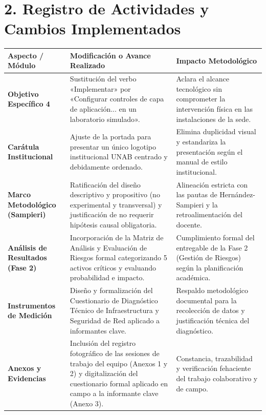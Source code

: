 \documentclass[11pt,letterpaper]{article}
\begin{document}
\section*{\color{unabblue}2. Registro de Actividades y Cambios Implementados}

\begin{table}[h!]
  \centering
  \small
  \renewcommand{\arraystretch}{1.3}
  \begin{tabularx}{\textwidth}{@{}>{\bfseries}p{3.2cm} X X@{}}
    \toprule
    \color{unabblue}\textbf{Aspecto / Módulo} & \color{unabblue}\textbf{Modificación o Avance Realizado} & \color{unabblue}\textbf{Impacto Metodológico} \\
    \midrule
    Objetivo Específico 4 & Sustitución del verbo «Implementar» por «Configurar controles de capa de aplicación... en un laboratorio simulado». & Aclara el alcance tecnológico sin comprometer la intervención física en las instalaciones de la sede. \\
    \midrule
    Carátula Institucional & Ajuste de la portada para presentar un único logotipo institucional UNAB centrado y debidamente ordenado. & Elimina duplicidad visual y estandariza la presentación según el manual de estilo institucional. \\
    \midrule
    Marco Metodológico (Sampieri) & Ratificación del diseño descriptivo y propositivo (no experimental y transversal) y justificación de no requerir hipótesis causal obligatoria. & Alineación estricta con las pautas de Hernández-Sampieri y la retroalimentación del docente. \\
    \midrule
    Análisis de Resultados (Fase 2) & Incorporación de la Matriz de Análisis y Evaluación de Riesgos formal categorizando 5 activos críticos y evaluando probabilidad e impacto. & Cumplimiento formal del entregable de la Fase 2 (Gestión de Riesgos) según la planificación académica. \\
    \midrule
    Instrumentos de Medición & Diseño y formalización del Cuestionario de Diagnóstico Técnico de Infraestructura y Seguridad de Red aplicado a informantes clave. & Respaldo metodológico documental para la recolección de datos y justificación técnica del diagnóstico. \\
    \midrule
    Anexos y Evidencias & Inclusión del registro fotográfico de las sesiones de trabajo del equipo (Anexos 1 y 2) y digitalización del cuestionario formal aplicado en campo a la informante clave (Anexo 3). & Constancia, trazabilidad y verificación fehaciente del trabajo colaborativo y de campo. \\
    \bottomrule
  \end{tabularx}
\end{table}
\end{document}

